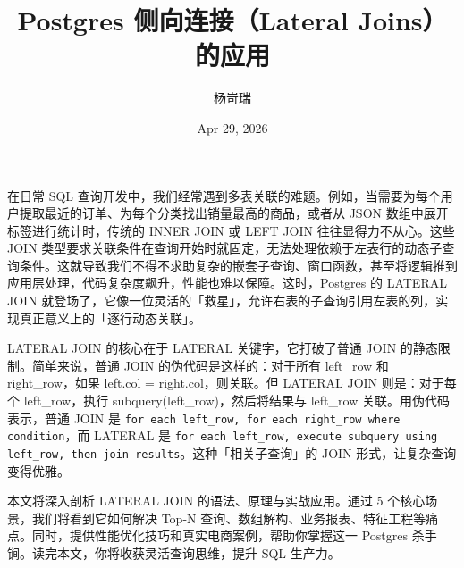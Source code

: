 \title{Postgres 侧向连接（Lateral Joins）的应用}
\author{杨岢瑞}
\date{Apr 29, 2026}
\maketitle
在日常 SQL 查询开发中，我们经常遇到多表关联的难题。例如，当需要为每个用户提取最近的订单、为每个分类找出销量最高的商品，或者从 JSON 数组中展开标签进行统计时，传统的 INNER JOIN 或 LEFT JOIN 往往显得力不从心。这些 JOIN 类型要求关联条件在查询开始时就固定，无法处理依赖于左表行的动态子查询条件。这就导致我们不得不求助复杂的嵌套子查询、窗口函数，甚至将逻辑推到应用层处理，代码复杂度飙升，性能也难以保障。这时，Postgres 的 LATERAL JOIN 就登场了，它像一位灵活的「救星」，允许右表的子查询引用左表的列，实现真正意义上的「逐行动态关联」。\par
LATERAL JOIN 的核心在于 LATERAL 关键字，它打破了普通 JOIN 的静态限制。简单来说，普通 JOIN 的伪代码是这样的：对于所有 left\_{}row 和 right\_{}row，如果 left.col = right.col，则关联。但 LATERAL JOIN 则是：对于每个 left\_{}row，执行 subquery(left\_{}row)，然后将结果与 left\_{}row 关联。用伪代码表示，普通 JOIN 是 \texttt{for each left\_{}row, for each right\_{}row where condition}，而 LATERAL 是 \texttt{for each left\_{}row, execute subquery using left\_{}row, then join results}。这种「相关子查询」的 JOIN 形式，让复杂查询变得优雅。\par
本文将深入剖析 LATERAL JOIN 的语法、原理与实战应用。通过 5 个核心场景，我们将看到它如何解决 Top-N 查询、数组解构、业务报表、特征工程等痛点。同时，提供性能优化技巧和真实电商案例，帮助你掌握这一 Postgres 杀手锏。读完本文，你将收获灵活查询思维，提升 SQL 生产力。\par
